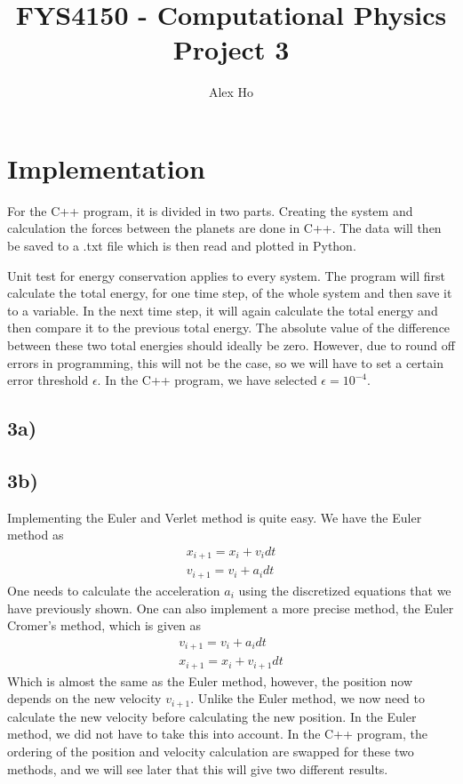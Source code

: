 \documentclass[12pt]{article}
\author{Alex Ho}
\title{FYS4150 - Computational Physics \\ Project 3}
\begin{document}
\maketitle
\section*{Implementation}
For the C++ program, it is divided in two parts. Creating the system and calculation the forces between the planets are done in C++. The data will then be saved to a .txt file which is then read and plotted in Python.

Unit test for energy conservation applies to every system. The program will first calculate the total energy, for one time step, of the whole system and then save it to a variable. In the next time step, it will again calculate the total energy and then compare it to the previous total energy. The absolute value of the difference between these two total energies should ideally be zero. However, due to round off errors in programming, this will not be the case, so we will have to set a certain error threshold $\epsilon$. In the C++ program, we have selected $\epsilon = 10^{-4}$.

\subsection*{3a)}
\subsection*{3b)}
Implementing the Euler and Verlet method is quite easy. We have the Euler method as
\begin{align*}
x_{i+1} = x_i + v_idt \\
v_{i+1} = v_i + a_idt
\end{align*}
One needs to calculate the acceleration $a_i$ using the discretized equations that we have previously shown. One can also implement a more precise method, the Euler Cromer's method, which is given as
\begin{align*}
v_{i+1} = v_i + a_idt \\
x_{i+1} = x_i + v_{i+1}dt
\end{align*}
Which is almost the same as the Euler method, however, the position now depends on the new velocity $v_{i+1}$. Unlike the Euler method, we now need to calculate the new velocity before calculating the new position. In the Euler method, we did not have to take this into account. In the C++ program, the ordering of the position and velocity calculation are swapped for these two methods, and we will see later that this will give two different results.
\end{document}
